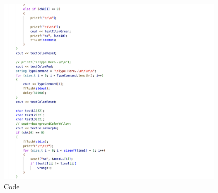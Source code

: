 \begin{figure}[h]
     \includegraphics[scale=0.12]{CodeScreenShot/speedtest-4.png}
    \caption{Code}
    \label{fig:code-screenshots}
\end{figure}
